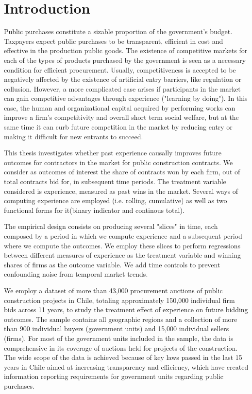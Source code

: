 \chapter{Introduction}
Public purchases constitute a sizable proportion of the government's budget. Taxpayers expect public purchases to be transparent, efficient in cost and effective in the production public goods. The existence of competitive markets for each of the types of products purchased by the government is seen as a necessary condition for efficient procurement. Usually, competitiveness is accepted to be negatively affected by the existence of artificial entry barriers, like regulation or collusion. However, a more complicated case arises if participants in the market can gain competitive advantages through experience ("learning by doing"). In this case, the human and organizational capital acquired by performing works can improve a firm's competitivity and overall short term social welfare, but at the same time it can curb future competition in the market by reducing entry or making it difficult for new entrants to succeed.

This thesis investigates whether past experience causally improves future outcomes for contractors in the market for public construction contracts.  We consider as outcomes of interest the share of contracts won by each firm, out of total contracts bid for, in subsequent time periods. The treatment variable considered is experience, measured as past wins in the market. Several ways of  computing experience are employed (i.e. rolling, cumulative) as well as two functional forms for it(binary indicator and continous total).

The empirical design consists on producing several "slices" in time, each composed by a period in which we compute experience and a subsequent period where we compute the outcomes. We employ these slices to perform regressions between different measures of experience as the treatment variable and winning shares of firms as the outcome variable. We add time controls  to prevent confounding noise from temporal market trends.

We employ a dataset of more than 43,000 procurement auctions of public construction projects in Chile, totaling approximately 150,000 individual firm bids across 11 years, to study the treatment effect of experience on future bidding outcomes. The sample contains all geographic regions and a collection of more than 900 individual buyers (government units) and 15,000 individual sellers (firms). For most of the government units included in the sample, the data is comprehensive in its coverage of auctions held for projects of the construction. The wide scope of the data is achieved because of key laws passed in the last 15 years in Chile aimed at increasing transparency and efficiency, which have created information reporting requirements for government units regarding public purchases.

